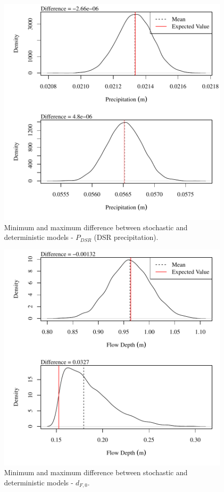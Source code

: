 \begin{center}
\begin{figure}[htbp]
	\includegraphics[width=6in]{"Figures/Results_DSR/V min-max diff p"}
	\caption{Minimum and maximum difference between stochastic and deterministic models - $P_{DSR}$ (DSR precipitation).}
\end{figure}
\end{center}
\newpage

\begin{center}
\begin{figure}[htbp]
	\includegraphics[width=6in]{"Figures/Results_DSR/V min-max diff depthF1"}
	\caption{Minimum and maximum difference between stochastic and deterministic models - $d_{F,0}$.}
\end{figure}
\end{center}
\newpage

